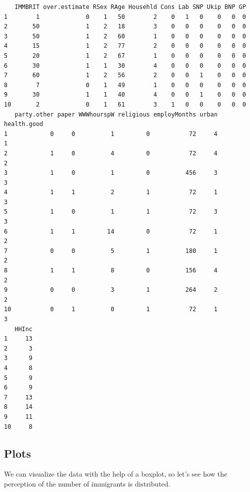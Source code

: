 \documentclass[]{book}
\newenvironment{Shaded}{\begin{snugshade}}{\end{snugshade}}
\newcommand{\KeywordTok}[1]{\textcolor[rgb]{0.13,0.29,0.53}{\textbf{#1}}}
\newcommand{\DataTypeTok}[1]{\textcolor[rgb]{0.13,0.29,0.53}{#1}}
\newcommand{\StringTok}[1]{\textcolor[rgb]{0.31,0.60,0.02}{#1}}
\newcommand{\CommentTok}[1]{\textcolor[rgb]{0.56,0.35,0.01}{\textit{#1}}}
\newcommand{\OtherTok}[1]{\textcolor[rgb]{0.56,0.35,0.01}{#1}}
\newcommand{\OperatorTok}[1]{\textcolor[rgb]{0.81,0.36,0.00}{\textbf{#1}}}
\newcommand{\NormalTok}[1]{#1}
\theoremstyle{definition}
\theoremstyle{definition}
\theoremstyle{definition}
\theoremstyle{remark}
\begin{document}
\begin{verbatim}
   IMMBRIT over.estimate RSex RAge Househld Cons Lab SNP Ukip BNP GP
1        1             0    1   50        2    0   1   0    0   0  0
2       50             1    2   18        3    0   0   0    0   0  0
3       50             1    2   60        1    0   0   0    0   0  0
4       15             1    2   77        2    0   0   0    0   0  0
5       20             1    2   67        1    0   0   0    0   0  0
6       30             1    1   30        4    0   0   0    0   0  0
7       60             1    2   56        2    0   0   1    0   0  0
8        7             0    1   49        1    0   0   0    0   0  0
9       30             1    1   40        4    0   0   1    0   0  0
10       2             0    1   61        3    1   0   0    0   0  0
   party.other paper WWWhourspW religious employMonths urban health.good
1            0     0          1         0           72     4           1
2            1     0          4         0           72     4           2
3            1     0          1         0          456     3           3
4            1     1          2         1           72     1           3
5            1     0          1         1           72     3           3
6            1     1         14         0           72     1           2
7            0     0          5         1          180     1           2
8            1     1          8         0          156     4           2
9            0     0          3         1          264     2           2
10           0     1          0         1           72     1           3
   HHInc
1     13
2      3
3      9
4      8
5      9
6      9
7     13
8     14
9     11
10     8
\end{verbatim}

\subsection{Plots}\label{plots}

We can visualize the data with the help of a boxplot, so let's see how
the perception of the number of immigrants is distributed.

\begin{Shaded}
\end{Shaded}
\end{document}
